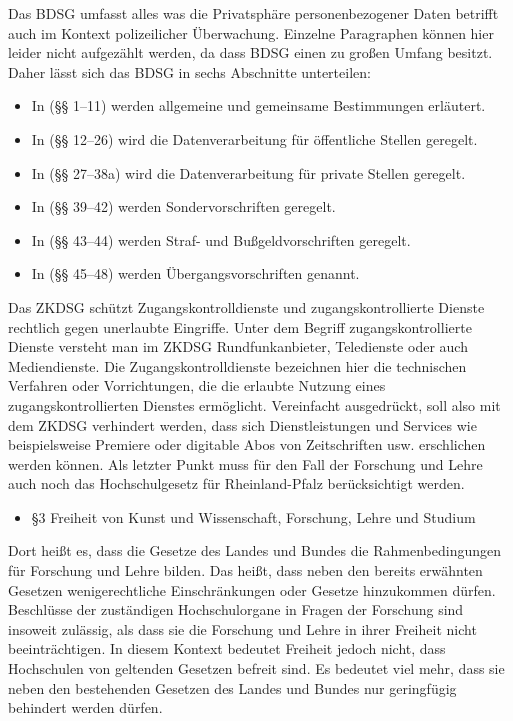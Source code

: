\documentclass[10pt,a4paper]{article}
\begin{document}
Das BDSG umfasst alles was die Privatsphäre personenbezogener Daten betrifft auch im Kontext polizeilicher Überwachung. Einzelne Paragraphen können hier leider nicht aufgezählt werden, da dass BDSG einen zu großen Umfang besitzt. Daher lässt sich das BDSG in sechs Abschnitte unterteilen:
\begin{itemize}
	\item In (§§ 1–11) werden allgemeine und gemeinsame Bestimmungen erläutert.
	\item In (§§ 12–26) wird die Datenverarbeitung für öffentliche Stellen geregelt.
	\item In (§§ 27–38a) wird die Datenverarbeitung für private Stellen geregelt.
	\item In (§§ 39–42) werden Sondervorschriften geregelt.
	\item In (§§ 43–44) werden Straf- und Bußgeldvorschriften geregelt.
	\item In (§§ 45–48) werden Übergangsvorschriften genannt.
\end{itemize}
Das ZKDSG schützt Zugangskontrolldienste und zugangskontrollierte Dienste rechtlich gegen unerlaubte Eingriffe. Unter dem Begriff zugangskontrollierte Dienste versteht man im ZKDSG Rundfunkanbieter, Teledienste oder auch Mediendienste. Die Zugangskontrolldienste bezeichnen hier die technischen Verfahren oder Vorrichtungen, die die erlaubte Nutzung eines zugangskontrollierten Dienstes ermöglicht. Vereinfacht ausgedrückt, soll also mit dem ZKDSG verhindert werden, dass sich Dienstleistungen und Services wie beispielsweise Premiere oder digitable Abos von Zeitschriften usw. erschlichen werden können. 
Als letzter Punkt muss für den Fall der Forschung und Lehre auch noch das Hochschulgesetz für Rheinland-Pfalz berücksichtigt werden. 
\begin{itemize}
	\item §3 Freiheit von Kunst und Wissenschaft, Forschung, Lehre und Studium
\end{itemize}
Dort heißt es, dass die Gesetze des Landes und Bundes die Rahmenbedingungen für Forschung und Lehre bilden. Das heißt, dass neben den bereits erwähnten Gesetzen wenigerechtliche Einschränkungen oder Gesetze hinzukommen dürfen. Beschlüsse der zuständigen Hochschulorgane in Fragen der Forschung sind insoweit zulässig, als dass sie die Forschung und Lehre in ihrer Freiheit nicht beeinträchtigen. In diesem Kontext bedeutet Freiheit jedoch nicht, dass Hochschulen von geltenden Gesetzen befreit sind. Es bedeutet viel mehr, dass sie neben den bestehenden Gesetzen des Landes und Bundes nur geringfügig behindert werden dürfen.
\end{document}
